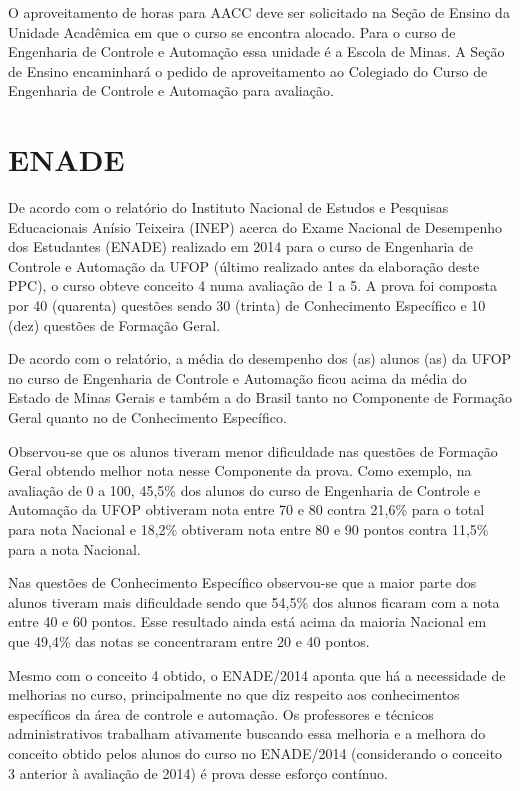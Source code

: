 O aproveitamento de horas para AACC deve ser solicitado na Seção de Ensino da Unidade Acadêmica em que o curso se encontra alocado. Para o curso de Engenharia de Controle e Automação essa unidade é a Escola de Minas. A Seção de Ensino encaminhará o pedido de aproveitamento ao Colegiado do Curso de Engenharia de Controle e Automação para avaliação.

\section{ENADE}

De acordo com o relatório do Instituto Nacional de Estudos e Pesquisas Educacionais Anísio Teixeira (INEP) acerca do Exame Nacional de Desempenho dos Estudantes (ENADE) realizado em 2014 para o curso de Engenharia de Controle e Automação da UFOP (último realizado antes da elaboração deste PPC), o curso obteve conceito 4 numa avaliação de 1 a 5.  A prova foi composta por 40 (quarenta) questões sendo 30 (trinta) de Conhecimento Específico e 10 (dez) questões de Formação Geral.

De acordo com o relatório, a média do desempenho dos (as) alunos (as) da UFOP no curso de Engenharia de Controle e Automação ficou acima da média do Estado de Minas Gerais e também a do Brasil tanto no Componente de Formação Geral quanto no de Conhecimento Específico. 

Observou-se que os alunos tiveram menor dificuldade nas questões de Formação Geral obtendo melhor nota nesse Componente da prova. Como exemplo, na avaliação de 0 a 100, 45,5\% dos alunos do curso de Engenharia de Controle e Automação da UFOP obtiveram nota entre 70 e 80 contra 21,6\% para o total para nota Nacional e 18,2\% obtiveram nota entre 80 e 90 pontos contra 11,5\% para a nota Nacional.

Nas questões de Conhecimento Específico observou-se que a maior parte dos alunos tiveram mais dificuldade sendo que 54,5\% dos alunos ficaram com a nota entre 40 e 60 pontos. Esse resultado ainda está acima da maioria Nacional em que 49,4\% das notas se concentraram entre 20 e 40 pontos. 

Mesmo com o conceito 4 obtido, o ENADE/2014 aponta que há a necessidade de melhorias no curso, principalmente no que diz respeito aos conhecimentos específicos da área de controle e automação. Os professores e técnicos administrativos trabalham ativamente buscando essa melhoria e a melhora do conceito obtido pelos alunos do curso no ENADE/2014 (considerando o conceito 3 anterior à avaliação de 2014) é prova desse esforço contínuo. 

